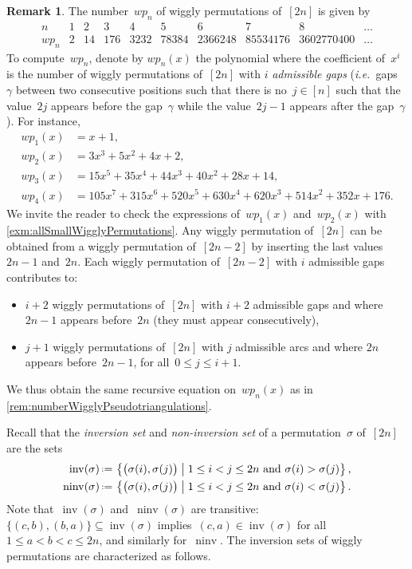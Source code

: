 \documentclass{amsart}
\theoremstyle{definition}
\newtheorem{remark}[theorem]{Remark}
\newcommand{\set}[2]{\left\{ #1 \;\middle|\; #2 \right\}} %
\newcommand{\eqdef}{\mbox{\,\raisebox{0.2ex}{\scriptsize\ensuremath{\mathrm:}}\ensuremath{=}\,}} %
\DeclareMathOperator{\inv}{inv} %
\DeclareMathOperator{\ninv}{ninv} %
\newcommand{\ie}{\textit{i.e.}~} %
\newcommand{\darkblue}{\color{darkblue}} %
\newcommand{\defn}[1]{\textsl{\darkblue #1}} %
\begin{document}
\begin{remark}
\label{rem:numberWigglyPermutations}
The number~$wp_n$ of wiggly permutations of~$[2n]$ is given by
\[
\begin{array}{c|ccccccccc}
n & 1 & 2 & 3 & 4 & 5 & 6 & 7 & 8 & \dots \\
\hline
wp_n & 2 & 14 & 176 & 3232 & 78384 & 2366248 & 85534176 & 3602770400 & \dots
\end{array}
\]
To compute~$wp_n$, denote by $wp_n(x)$ the polynomial where the coefficient of~$x^i$ is the number of wiggly permutations of~$[2n]$ with $i$ \defn{admissible gaps} (\ie gaps~$\gamma$ between two consecutive positions such that there is no~$j \in [n]$ such that the value~$2j$ appears before the gap~$\gamma$ while the value~$2j-1$ appears after the gap~$\gamma$).
For instance,
\begin{align*}
	wp_1(x) & = x + 1, \\
	wp_2(x) & = 3 x^3 + 5 x^2 + 4 x + 2, \\
	wp_3(x) & = 15 x^5 + 35 x^4 + 44 x^3 + 40 x^2 + 28 x + 14, \\
	wp_4(x) & = 105 x^7 + 315 x^6 + 520 x^5 + 630 x^4 + 620 x^3 + 514 x^2 + 352 x + 176.
\end{align*}
We invite the reader to check the expressions of~$wp_1(x)$ and~$wp_2(x)$ with \cref{exm:allSmallWigglyPermutations}.
Any wiggly permutation of~$[2n]$ can be obtained from a wiggly permutation of~$[2n-2]$ by inserting the last values~$2n-1$ and~$2n$.
Each wiggly permutation of~$[2n-2]$ with $i$ admissible gaps contributes to:
\begin{itemize}
\item $i+2$ wiggly permutations of~$[2n]$ with $i+2$ admissible gaps and where~$2n-1$ appears before~$2n$ (they must appear consecutively),
\item $j+1$ wiggly permutations of~$[2n]$ with $j$ admissible arcs and where $2n$ appears before~$2n-1$, for all~$0 \le j \le i+1$.
\end{itemize}
We thus obtain the same recursive equation on~$wp_n(x)$ as in \cref{rem:numberWigglyPseudotriangulations}.
\end{remark}

Recall that the \defn{inversion set} and \defn{non-inversion set} of a permutation~$\sigma$ of~$[2n]$ are the sets
\begin{align*}
\inv(\sigma) & \eqdef \set{\big( \sigma(i), \sigma(j) \big)}{1 \le i < j \le 2n \text{ and } \sigma(i) > \sigma(j)}, \\
\ninv(\sigma) & \eqdef \set{\big( \sigma(i), \sigma(j) \big)}{1 \le i < j \le 2n \text{ and } \sigma(i) < \sigma(j)}.
\end{align*}
Note that~$\inv(\sigma)$ and~$\ninv(\sigma)$ are transitive: $\{(c,b), (b,a)\} \subseteq \inv(\sigma)$ implies~$(c,a) \in \inv(\sigma)$ for all~${1 \le a < b < c \le 2n}$, and similarly for~$\ninv$.
The inversion sets of wiggly permutations are characterized as follows.
\end{document}
